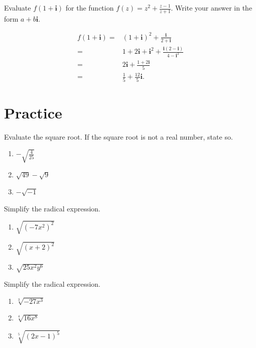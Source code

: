 \documentclass[en,12pt]{elegantbook}
\providecommand{\tightlist}{%
  \setlength{\itemsep}{0pt}\setlength{\parskip}{0pt}}
\newcommand{\ii}{\mathbf{i}}
\providecommand{\tightlist}{%
  \setlength{\itemsep}{0pt}\setlength{\parskip}{0pt}}
\let\BeginKnitrBlock\begin \let\EndKnitrBlock\end
\begin{document}
\BeginKnitrBlock{example}
\protect\hypertarget{exm:unnamed-chunk-83}{}{\label{exm:unnamed-chunk-83} }
Evaluate \(f(1+\ii)\) for the function \(f(z)=z^2+\frac{z-1}{z+1}\). Write your answer in the form \(a+b\ii\).
\EndKnitrBlock{example}

\BeginKnitrBlock{solution}


\[
\begin{aligned}
f(1+\ii)=&(1+\ii)^2+\frac{\ii}{2+\ii}\\
=&1+2\ii+\ii^2+\frac{\ii(2-\ii)}{4-\ii^2}\\
=&2\ii+\frac{1+2\ii}{5}\\
=&\frac15+\frac{12}{5}\ii.
\end{aligned}
\]
\EndKnitrBlock{solution}

\hypertarget{practice-3}{%
\section{Practice}\label{practice-3}}

\BeginKnitrBlock{exercise}
\protect\hypertarget{exr:unnamed-chunk-85}{}{\label{exr:unnamed-chunk-85} }
Evaluate the square root. If the square root is not a real number, state so.

\begin{enumerate}
\def\labelenumi{\arabic{enumi}.}
\tightlist
\item
  \(-\sqrt{\frac{4}{25}}\)
\item
  \(\sqrt{49}-\sqrt{9}\)
\item
  \(-\sqrt{-1}\)\null
\end{enumerate}
\EndKnitrBlock{exercise}

\BeginKnitrBlock{exercise}
\protect\hypertarget{exr:unnamed-chunk-86}{}{\label{exr:unnamed-chunk-86} }
Simplify the radical expression.

\begin{enumerate}
\def\labelenumi{\arabic{enumi}.}
\tightlist
\item
  \(\sqrt{(-7x^2)^2}\)
\item
  \(\sqrt{(x+2)^2}\)
\item
  \(\sqrt{25x^2y^6}\)
\end{enumerate}
\EndKnitrBlock{exercise}

\BeginKnitrBlock{exercise}
\protect\hypertarget{exr:unnamed-chunk-87}{}{\label{exr:unnamed-chunk-87} }
Simplify the radical expression.

\begin{enumerate}
\def\labelenumi{\arabic{enumi}.}
\tightlist
\item
  \(\sqrt[3]{-27x^3}\)
\item
  \(\sqrt[4]{16x^8}\)
\item
  \(\sqrt[5]{(2x-1)^5}\)
\end{enumerate}
\EndKnitrBlock{exercise}
\end{document}
